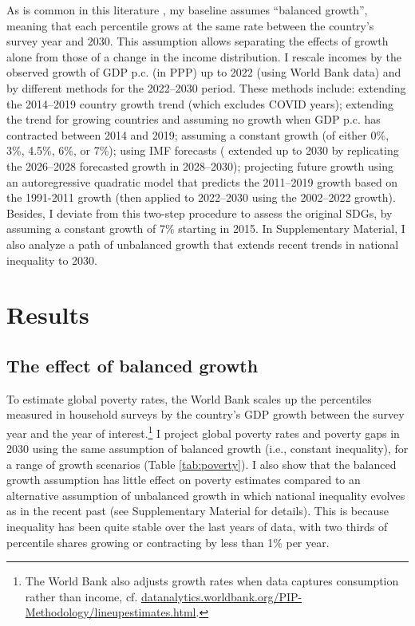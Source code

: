 As is common in this literature \citep{karver_mdgs_2012,hellebrandt_future_2015,bicaba_can_2017}, my baseline assumes ``balanced growth'', meaning that each percentile grows at the same rate between the country's survey year and 2030. This assumption allows separating the effects of growth alone from those of a change in the income distribution. 
I rescale incomes by the observed growth of GDP p.c. (in PPP) up to 2022 (using World Bank data) and by different methods for the 2022--2030 period. 
These methods include: extending the 2014--2019 country growth trend (which excludes COVID years); extending the trend for growing countries and assuming no growth when GDP p.c. has contracted between 2014 and 2019; assuming a constant growth (of either 0\%, 3\%, 4.5\%, 6\%, or 7\%); using IMF forecasts (\cite{imf_world_2023} extended up to 2030 by replicating the 2026--2028 forecasted growth in 2028--2030); projecting future growth using an autoregressive quadratic model that predicts the 2011--2019 growth based on the 1991-2011 growth (then applied to 2022--2030 using the 2002--2022 growth). Besides, I deviate from this two-step procedure to assess the original SDGs, 
by assuming a constant growth of 7\% starting in 2015. In Supplementary Material, I also analyze a path of unbalanced growth that extends recent trends in national inequality to 2030.  

\section{Results\label{sec:results}}
\subsection{The effect of balanced growth\label{subsec:balanced_growth}}

To estimate global poverty rates, the World Bank scales up the percentiles measured in household surveys by the country's GDP growth between the survey year and the year of interest.\footnote{The World Bank also adjusts growth rates when data captures consumption rather than income, cf. \href{https://datanalytics.worldbank.org/PIP-Methodology/lineupestimates.html\#extrapolations}{datanalytics.worldbank.org/PIP-Methodology/lineupestimates.html}.} I project global poverty rates and poverty gaps in 2030 using the same assumption of balanced growth (i.e., constant inequality), for a range of growth scenarios (Table \ref{tab:poverty}). I also show that the balanced growth assumption has little effect on poverty estimates compared to an alternative assumption of unbalanced growth in which national inequality evolves as in the recent past (see Supplementary Material for details). This is because inequality has been quite stable over the last years of data, with two thirds of percentile shares growing or contracting by less than 1\% per year.

